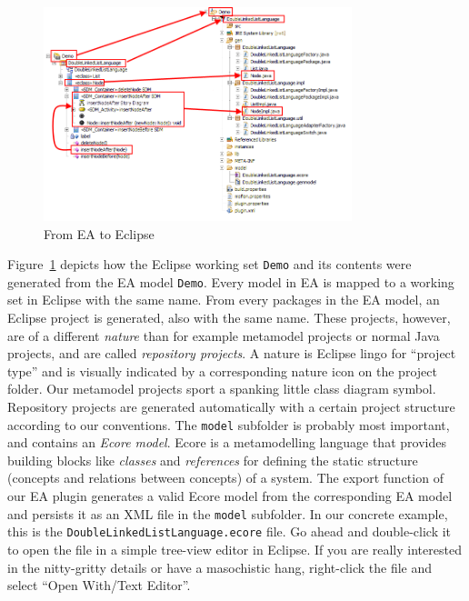 \begin{figure}[!h]
	\centering
  \includegraphics[width=0.8\textwidth]{pics/bothexplorers}
	\caption{From EA to Eclipse}
	\label{fig_fromEAtoEclipse}
\end{figure}

Figure~\ref{fig_fromEAtoEclipse} depicts how the Eclipse working set
\texttt{Demo} and its contents were generated from the EA model \texttt{Demo}.
Every model in EA is mapped to a working set in Eclipse with the same name. 
From every packages in the EA model, an Eclipse project is generated, also with
the same name.  These projects, however, are of a different
\emph{nature} than for example metamodel projects or normal Java projects, and
are called \emph{repository projects}.  A nature is Eclipse lingo for ``project
type'' and is visually indicated by a corresponding nature icon on the project
folder.  Our  metamodel projects sport a spanking little class diagram symbol. 
Repository projects are generated automatically  with a certain project
structure according to our conventions.  The  \texttt{model} subfolder is
probably most important, and contains an  \emph{Ecore model}.  Ecore is a
metamodelling language that provides building  blocks like \emph{classes} and
\emph{references} for defining the  static structure (concepts and relations
between concepts) of a system.  The  export function of our EA plugin generates
a valid Ecore model from the  corresponding EA model and persists it as an XML
file in the \texttt{model}  subfolder.  In our concrete example, this is the
\texttt{DoubleLinkedListLanguage.ecore} file.  Go ahead and double-click it to
open the file in a simple tree-view editor in Eclipse.  If you are really
interested in the nitty-gritty details or have a masochistic hang, right-click
the file and select ``Open With/Text Editor''. 

